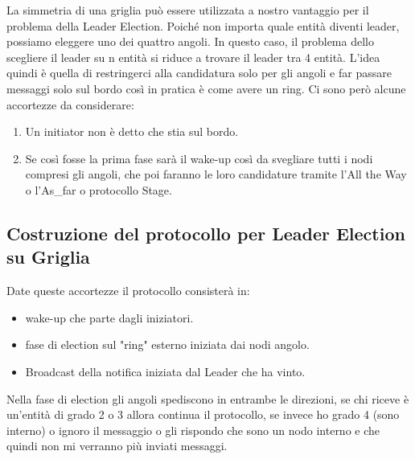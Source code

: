 La simmetria di una griglia può essere utilizzata a nostro vantaggio per il
problema della Leader Election. Poiché non importa quale entità diventi leader,
possiamo eleggere uno dei quattro angoli. In questo caso, il problema dello
scegliere il leader su n entità si riduce a trovare il leader tra 4 entità.
L'idea quindi è quella di restringerci alla candidatura solo per gli angoli e
far passare messaggi solo sul bordo così in pratica è come avere un ring. Ci
sono però alcune accortezze da considerare:
\begin{enumerate}
    \item Un initiator non è detto che stia sul bordo.
    \item Se così fosse la prima fase sarà il wake-up così da svegliare tutti i
          nodi compresi gli angoli, che poi faranno le loro candidature tramite l'All
          the Way o l'As\_far o protocollo Stage.
\end{enumerate}
\subsection{Costruzione del protocollo per Leader Election su Griglia}
Date queste accortezze il protocollo consisterà in:
\begin{itemize}
    \item wake-up che parte dagli iniziatori.
    \item fase di election sul "ring" esterno iniziata dai nodi angolo.
    \item Broadcast della notifica iniziata dal Leader che ha vinto.
\end{itemize}
Nella fase di election gli angoli spediscono in entrambe le direzioni, se chi
riceve è un'entità di grado 2 o 3 allora continua il protocollo, se invece ho
grado 4 (sono interno) o ignoro il messaggio o gli rispondo che sono un nodo
interno e che quindi non mi verranno più inviati messaggi.\\

